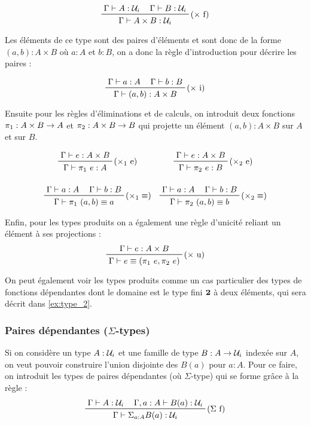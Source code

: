 \documentclass[../../rapport.tex]{subfiles}
\begin{document}
  $$
  \prfinterspace=1.2em
  \prftree[r]{($\times$ f)}
  {\Gamma \vdash A : \U_i}
  {\Gamma \vdash B : \U_i}
  {\Gamma \vdash A \times B : \U_i}
  $$

  Les éléments de ce type sont des paires d'éléments et sont donc de la forme $(a, b) : A \times B$ où $a : A$ et $b : B$,
  on a donc la règle d'introduction pour décrire les paires :

  $$
  \prfinterspace=1.2em
  \prftree[r]{($\times$ i)}
  {\Gamma \vdash a : A}
  {\Gamma \vdash b : B}
  {\Gamma \vdash (a, b) : A \times B}
  $$

  Ensuite pour les règles d'éliminations et de calculs,
  on introduit deux fonctions $\pi_1 : A \times B \rightarrow A$ et $\pi_2 : A \times B \rightarrow B$
  qui projette un élément $(a, b) : A \times B$ sur $A$ et sur $B$.

  $$
  \prfinterspace=1.2em
  \begin{array}{cc}
    \prftree[r]{($\times_1$ e)}
    {\Gamma \vdash e : A \times B}
    {\Gamma \vdash \pi_1\ e : A}
    &
    \prftree[r]{($\times_2$ e)}
    {\Gamma \vdash e : A \times B}
    {\Gamma \vdash \pi_2\ e : B}
    \vspace{1.5em}\\
    \prftree[r]{($\times_1 \equiv$)}
    {\Gamma \vdash a : A}
    {\Gamma \vdash b : B}
    {\Gamma \vdash \pi_1\ (a, b) \equiv a}
    &
    \prftree[r]{($\times_2 \equiv$)}
    {\Gamma \vdash a : A}
    {\Gamma \vdash b : B}
    {\Gamma \vdash \pi_2\ (a, b) \equiv b}
  \end{array}
  $$

  Enfin, pour les types produits on a également une règle d'unicité reliant un élément à ses projections :
  $$
  \prftree[r]{($\times$ u)}
  {\Gamma \vdash e : A \times B}
  {\Gamma \vdash e \equiv (\pi_1\ e, \pi_2\ e)}
  $$

  On peut également voir les types produits comme un cas particulier des types de fonctions dépendantes dont le domaine
  est le type fini $\operatorname{\textbf{2}}$ à deux éléments, qui sera décrit dans \ref{ex:type_2}.

  \subsubsection{Paires dépendantes ($\Sigma$-types)}

  Si on considère un type $A : \mathcal U_i$ et une famille de type $B : A \rightarrow \mathcal U_i$ indexée sur $A$,
  on veut pouvoir construire l'union disjointe des $B(a)$ pour $a : A$.
  Pour ce faire, on introduit les types de paires dépendantes (où $\Sigma$-type) qui se forme grâce à la règle :
  $$
  \prfinterspace=1.2em
  \prftree[r]{($\Sigma$ f)}
    {\Gamma \vdash A : \U_i}
    {\Gamma, a : A \vdash B(a) : \U_i}
  {\Gamma \vdash \Sigma_{a : A}B(a) : \U_i}
  $$
\end{document}

